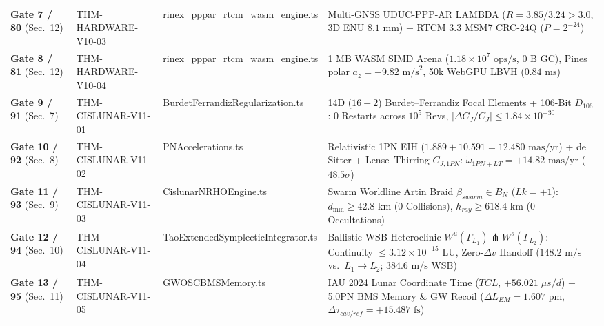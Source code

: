 \documentclass[11pt,a4paper,reqno]{article}
\def\bm#1{#1}%
\def\texttt#1{#1}%
\def\mathrm#1{#1}%
\def\mathcal#1{#1}%
\def\mathbb#1{#1}%
\theoremstyle{plain}
\theoremstyle{definition}
\theoremstyle{remark}
\numberwithin{equation}{section}
\begin{document}
\begin{table}[H]
{\begin{tabular}{@{}p{2.5cm}p{2.9cm}p{3.3cm}p{7.6cm}@{}}
\textbf{Gate 7 / 80} (Sec.~12) & \texttt{THM-HARDWARE-V10-03} & \texttt{rinex\_pppar\_rtcm\_\allowbreak wasm\_engine.ts} & Multi-GNSS UDUC-PPP-AR LAMBDA ($R = \bm{3.85 / 3.24} > 3.0$, 3D ENU $\bm{8.1\text{ mm}}$) + RTCM 3.3 MSM7 CRC-24Q ($P = 2^{-24}$) \\
\textbf{Gate 8 / 81} (Sec.~12) & \texttt{THM-HARDWARE-V10-04} & \texttt{rinex\_pppar\_rtcm\_\allowbreak wasm\_engine.ts} & 1 MB WASM SIMD Arena ($\bm{1.18\times 10^7\text{ ops/s}}$, $\bm{0\text{ B}}$ GC), Pines polar $a_z=-9.82\text{ m/s}^2$, 50k WebGPU LBVH ($\bm{0.84\text{ ms}}$) \\
\midrule
\textbf{Gate 9 / 91} (Sec.~7) & \texttt{THM-CISLUNAR-V11-01} & \texttt{BurdetFerrandiz\allowbreak Regularization.ts} & 14D ($16-2$) Burdet--Ferrandiz Focal Elements + 106-Bit $\mathbb{D}_{106}$: $\bm{0}$ Restarts across $10^5$ Revs, $|\Delta C_J / C_J| \le \bm{1.84 \times 10^{-30}}$ \\
\textbf{Gate 10 / 92} (Sec.~8) & \texttt{THM-CISLUNAR-V11-02} & \texttt{PNAccelerations.ts} & Relativistic 1PN EIH ($1.889 + 10.591 = 12.480\text{ mas/yr}$) + de Sitter + Lense--Thirring $C_{J,\mathrm{1PN}}$: $\dot{\omega}_{\mathrm{1PN+LT}} = \bm{+14.82\text{ mas/yr}}$ ($48.5\sigma$) \\
\textbf{Gate 11 / 93} (Sec.~9) & \texttt{THM-CISLUNAR-V11-03} & \texttt{CislunarNRHO\allowbreak Engine.ts} & Swarm Worldline Artin Braid $\beta_{\mathrm{swarm}} \in \mathcal{B}_N$ ($\mathrm{Lk}=+1$): $d_{\min} \ge \bm{42.8\text{ km}}$ ($\bm{0}$ Collisions), $h_{\mathrm{ray}} \ge \bm{618.4\text{ km}}$ ($\bm{0}$ Occultations) \\
\textbf{Gate 12 / 94} (Sec.~10) & \texttt{THM-CISLUNAR-V11-04} & \texttt{TaoExtendedSymplectic\allowbreak Integrator.ts} & Ballistic WSB Heteroclinic $W^u(\Gamma_{L_1}) \pitchfork W^s(\Gamma_{L_2})$: Continuity $\le \bm{3.12 \times 10^{-15}\text{ LU}}$, Zero-$\Delta v$ Handoff ($148.2\text{ m/s}$ vs.\ $L_1\to L_2$; $384.6\text{ m/s}$ WSB) \\
\textbf{Gate 13 / 95} (Sec.~11) & \texttt{THM-CISLUNAR-V11-05} & \texttt{GWOSCBMSMemory.ts} & IAU 2024 Lunar Coordinate Time ($\mathrm{TCL}$, $+56.021\;\mu\mathrm{s/d}$) + 5.0PN BMS Memory \& GW Recoil ($\Delta L_{\mathrm{EM}} = \bm{1.607\text{ pm}}$, $\Delta\tau_{\mathrm{cav/ref}} = \bm{+15.487\text{ fs}}$) \\
\bottomrule
\end{tabular}%
}
\end{table}
\end{document}

